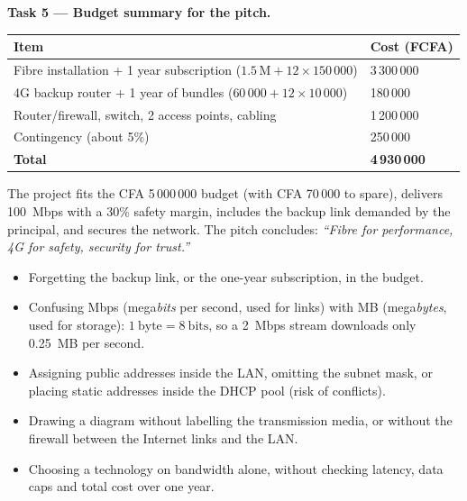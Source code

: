 \documentclass[11pt]{article}
\begin{document}
\textbf{Task 5 — Budget summary for the pitch.}

\begin{center}
\begin{tabularx}{\linewidth}{|X|l|}
\hline
\rowcolor{popblueL} \textbf{Item} & \textbf{Cost (FCFA)} \\
\hline
Fibre installation + 1 year subscription ($1.5\,\text{M} + 12 \times 150\,000$) & 3\,300\,000 \\
\hline
4G backup router + 1 year of bundles ($60\,000 + 12 \times 10\,000$) & 180\,000 \\
\hline
Router/firewall, switch, 2 access points, cabling & 1\,200\,000 \\
\hline
Contingency (about 5\%) & 250\,000 \\
\hline
\textbf{Total} & \textbf{4\,930\,000} \\
\hline
\end{tabularx}
\end{center}

The project fits the CFA 5\,000\,000 budget (with CFA 70\,000 to spare), delivers \SI{100}{Mbps} with a 30\% safety margin, includes the backup link demanded by the principal, and secures the network. The pitch concludes: \emph{``Fibre for performance, 4G for safety, security for trust.''}

\begin{attention}
\begin{itemize}
\item Forgetting the backup link, or the one-year subscription, in the budget.
\item Confusing \si{Mbps} (mega\emph{bits} per second, used for links) with \si{MB} (mega\emph{bytes}, used for storage): $1\ \mathrm{byte} = 8\ \mathrm{bits}$, so a \SI{2}{Mbps} stream downloads only \SI{0.25}{MB} per second.
\item Assigning public addresses inside the LAN, omitting the subnet mask, or placing static addresses inside the DHCP pool (risk of conflicts).
\item Drawing a diagram without labelling the transmission media, or without the firewall between the Internet links and the LAN.
\item Choosing a technology on bandwidth alone, without checking latency, data caps and total cost over one year.
\end{itemize}
\end{attention}

\newpage
\end{document}
